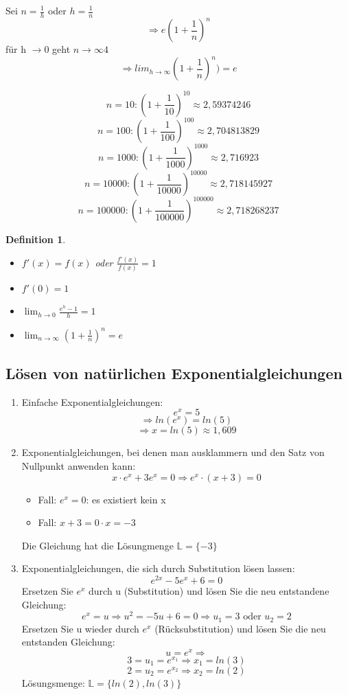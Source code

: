 \documentclass{scrbook}
\newtheorem{definition}{Definition}
\begin{document}
Sei $n = \frac 1 h $ oder $h = \frac 1 n$
\[ \Rightarrow e  (1+ \frac 1 n )^n\]
für h $\rightarrow 0 $ geht $ n \rightarrow \infty4$
\[ \Rightarrow lim_{h \rightarrow \infty}(1+\frac 1 n )^n) = e\]

\[n = 10: (1+ \frac 1 {10} )^{10} \approx 2,59374246\]
\[n = 100: (1+ \frac 1 {100} )^{100} \approx 2,704813829\]
\[n = 1000: (1+ \frac 1 {1000} )^{1000} \approx 2,716923\]
\[n = 10000: (1+ \frac 1 {10000} )^{10000} \approx 2,718145927\]
\[n = 100000: (1+ \frac 1 {100000} )^{100000} \approx 2,718268237\]

\begin{definition}
\begin{itemize}
\item $f'(x) = f(x) $ oder $ \frac {f'(x) }{f(x)} = 1$
\item $f'(0) = 1$
\item $ \lim_{h\rightarrow0}\frac{e^h - 1}h = 1$
\item$\lim_{n\rightarrow \infty }(1+ \frac1 n )^n = e$
\end{itemize}
\end{definition}


\subsection{Lösen von natürlichen Exponentialgleichungen}
\begin{enumerate}
\item {Einfache Exponentialgleichungen: 
\[e^x = 5\]
\[ \Rightarrow ln(e^x) = ln(5)\]
\[ \Rightarrow x = ln(5) \approx 1,609\]
}

\item {Exponentialgleichungen, bei denen man ausklammern und den Satz von Nullpunkt anwenden kann:
\[x \cdot e^x + 3e^x = 0 \Rightarrow e^x \cdot(x+3) = 0\]
\begin{itemize}
\item Fall: $e^x = 0$: es existiert kein x
\item Fall: $ x + 3 = 0 \cdot x = -3$
\end{itemize}
Die Gleichung hat die Lösungmenge $\mathbb{L} = \{-3\}$
}

\item{Exponentialgleichungen, die sich durch Substitution lösen lassen:
\[e^{2x} - 5e^x+6 = 0\]
Ersetzen Sie $e^x$ durch u (Substitution) und lösen Sie die neu entstandene Gleichung:
\[e^x = u \Rightarrow u^2 = - 5u + 6 = 0 \Rightarrow u_1 = 3 \text{ oder } u_2 = 2\]
Ersetzen Sie u wieder durch $e^x$ (Rücksubstitution) und lösen Sie die neu entstanden Gleichung:
\[u = e^x \Rightarrow \]
\[ 3 = u_1 = e^{x_1} \Rightarrow x_1 = ln(3)\]
\[2 = u_2 = e^{x_2} \Rightarrow x_2 = ln(2)\]
Lösungsmenge: $\mathbb{L} = \{ln(2), ln(3)\}$
}
\end{enumerate}
\end{document}
